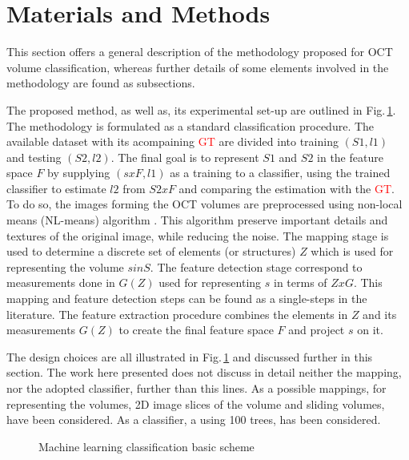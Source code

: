 \graphicspath{ {./content/method/figures/}}

\section{Materials and Methods}

  This section offers a general description of the methodology proposed for OCT volume classification, whereas further details of some elements involved in the methodology are found as subsections.
  
  The proposed method, as well as, its experimental set-up are outlined in Fig.\,\ref{fig:ML-scheme}.
  The methodology is formulated as a standard classification procedure.
  The available dataset with its acompaining \textcolor{red}{GT} are divided into training $(S1,l1)$ and testing $(S2,l2)$. 
  The final goal is to represent $S1$ and $S2$ in the feature space $F$ by supplying $(sxF,l1)$ as a training to a classifier, using the trained classifier to estimate $l2$ from $S2xF$ and comparing the estimation with the \textcolor{red}{GT}.
   To do so, the images forming the OCT volumes are preprocessed using non-local means (NL-means) algorithm \cite{buades2005non}. This algorithm preserve important details and textures of the original image, while reducing the noise.
   The mapping stage is used to determine a discrete set of elements (or structures) $Z$  which is used for representing the volume $s  in S$.
   The feature detection stage correspond to measurements done in $G(Z)$ used for representing $s$ in terms of $ZxG$. 
   This mapping and feature detection steps can be found as a single-steps in the literature.
   The feature extraction procedure combines the elements in $Z$ and its measurements $G(Z)$ to create the final feature space $F$ and project $s$ on it.
   
   The design choices are all illustrated in Fig.\,\ref{fig:ML-scheme} and discussed further in this section. The work here presented does not discuss in detail neither the mapping, nor the adopted classifier, further than this lines.
   As a possible mappings, for representing the volumes, 2D image slices of the volume and \color{red}{7x7x7}\color{black} sliding volumes, have been considered. 
   As a classifier, a \color{red}{Random Forest}\color{black} using 100 trees, has been considered.
   
\begin{figure}[h]
  \caption{Machine learning classification basic scheme}
  \label{fig:ML-scheme}
\end{figure}

